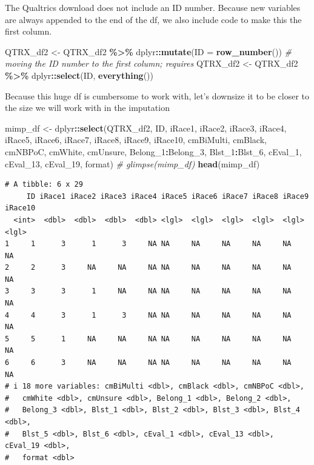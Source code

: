 \documentclass[
  11pt,
]{book}
\newenvironment{Shaded}{\begin{snugshade}}{\end{snugshade}}
\newcommand{\AttributeTok}[1]{\textcolor[rgb]{0.27,0.27,0.27}{#1}}
\newcommand{\CommentTok}[1]{\textcolor[rgb]{0.37,0.37,0.37}{\textit{#1}}}
\newcommand{\FunctionTok}[1]{\textcolor[rgb]{0.27,0.27,0.27}{\textbf{#1}}}
\newcommand{\NormalTok}[1]{#1}
\newcommand{\OtherTok}[1]{\textcolor[rgb]{0.37,0.37,0.37}{#1}}
\newcommand{\SpecialCharTok}[1]{\textcolor[rgb]{0.43,0.43,0.43}{\textbf{#1}}}
\begin{document}
The Qualtrics download does not include an ID number. Because new variables are always appended to the end of the df, we also include code to make this the first column.

\begin{Shaded}
\begin{Highlighting}[]
\NormalTok{QTRX\_df2 }\OtherTok{\textless{}{-}}\NormalTok{ QTRX\_df2 }\SpecialCharTok{\%\textgreater{}\%}
\NormalTok{    dplyr}\SpecialCharTok{::}\FunctionTok{mutate}\NormalTok{(}\AttributeTok{ID =} \FunctionTok{row\_number}\NormalTok{())}
\CommentTok{\# moving the ID number to the first column; requires}
\NormalTok{QTRX\_df2 }\OtherTok{\textless{}{-}}\NormalTok{ QTRX\_df2 }\SpecialCharTok{\%\textgreater{}\%}
\NormalTok{    dplyr}\SpecialCharTok{::}\FunctionTok{select}\NormalTok{(ID, }\FunctionTok{everything}\NormalTok{())}
\end{Highlighting}
\end{Shaded}

Because this huge df is cumbersome to work with, let's downsize it to be closer to the size we will work with in the imputation

\begin{Shaded}
\begin{Highlighting}[]
\NormalTok{mimp\_df }\OtherTok{\textless{}{-}}\NormalTok{ dplyr}\SpecialCharTok{::}\FunctionTok{select}\NormalTok{(QTRX\_df2, ID, iRace1, iRace2, iRace3, iRace4,}
\NormalTok{    iRace5, iRace6, iRace7, iRace8, iRace9, iRace10, cmBiMulti, cmBlack,}
\NormalTok{    cmNBPoC, cmWhite, cmUnsure, Belong\_1}\SpecialCharTok{:}\NormalTok{Belong\_3, Blst\_1}\SpecialCharTok{:}\NormalTok{Blst\_6, cEval\_1,}
\NormalTok{    cEval\_13, cEval\_19, format)}
\CommentTok{\# glimpse(mimp\_df)}
\FunctionTok{head}\NormalTok{(mimp\_df)}
\end{Highlighting}
\end{Shaded}

\begin{verbatim}
# A tibble: 6 x 29
     ID iRace1 iRace2 iRace3 iRace4 iRace5 iRace6 iRace7 iRace8 iRace9 iRace10
  <int>  <dbl>  <dbl>  <dbl>  <dbl> <lgl>  <lgl>  <lgl>  <lgl>  <lgl>  <lgl>  
1     1      3      1      3     NA NA     NA     NA     NA     NA     NA     
2     2      3     NA     NA     NA NA     NA     NA     NA     NA     NA     
3     3      3      1     NA     NA NA     NA     NA     NA     NA     NA     
4     4      3      1      3     NA NA     NA     NA     NA     NA     NA     
5     5      1     NA     NA     NA NA     NA     NA     NA     NA     NA     
6     6      3     NA     NA     NA NA     NA     NA     NA     NA     NA     
# i 18 more variables: cmBiMulti <dbl>, cmBlack <dbl>, cmNBPoC <dbl>,
#   cmWhite <dbl>, cmUnsure <dbl>, Belong_1 <dbl>, Belong_2 <dbl>,
#   Belong_3 <dbl>, Blst_1 <dbl>, Blst_2 <dbl>, Blst_3 <dbl>, Blst_4 <dbl>,
#   Blst_5 <dbl>, Blst_6 <dbl>, cEval_1 <dbl>, cEval_13 <dbl>, cEval_19 <dbl>,
#   format <dbl>
\end{verbatim}
\end{document}
